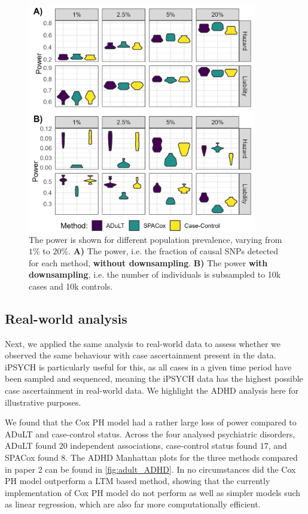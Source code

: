 \begin{figure}[h]
	\centering
	\includegraphics[width=10cm]{results/adult_combined_C250_power}
	\caption[Power simulation results with $ 250 $ causal SNPs under both generative models and varying prevalences.]{The power is shown for different population prevalence, varying from $ 1\% $ to $ 20\% $. \textbf{A)} The power, i.e. the fraction of causal SNPs detected for each method, \textbf{without downsampling}. \textbf{B)} The power \textbf{with downsampling}, i.e. the number of individuals is subsampled to 10k cases and 10k controls.}
	\label{fig:adult_simulations}
\end{figure}


\subsection{Real-world analysis}
Next, we applied the same analysis to real-world data to assess whether we observed the same behaviour with case ascertainment present in the data. iPSYCH is particularly useful for this, as all cases in a given time period have been sampled and sequenced, meaning the iPSYCH data has the highest possible case ascertainment in real-world data. We highlight the ADHD analysis here for illustrative purposes.

We found that the Cox PH model had a rather large loss of power compared to ADuLT and case-control status. Across the four analysed psychiatric disorders, ADuLT found $ 20 $ independent associations, case-control status found $ 17 $, and SPACox found $ 8 $. The ADHD Manhattan plots for the three methods compared in paper 2 can be found in \cref{fig:adult_ADHD}. In no circumstances did the Cox PH model outperform a LTM based method, showing that the currently implementation of Cox PH model do not perform as well as simpler models such as linear regression, which are also far more computationally efficient.

